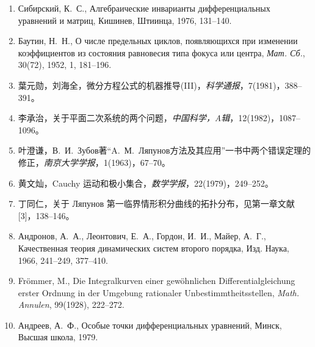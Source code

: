 \begin{enumerate}
\item Сибирский, К.\ С., Алгебраические инварианты дифференциальных уравнений и матриц, Кишинев, Штиинца, 1976, 131--140.
\item Баутин, Н.\ Н., О числе предельных циклов, появляющихся при изменении коэффициентов из состояния равновесия типа фокуса или центра, \textit{Мат. Сб.}, 30(72), 1952, 1, 181--196.
\item 葉元勋，刘海全，微分方程公式的机器推导(III)，\textit{科学通报}，7(1981)，388--391。
\item 李承治，关于平面二次系统的两个问题，\textit{中国科学，A辑}，12(1982)，1087--1096。
\item 叶澄谦，В.\ И.\ Зубов著“A.\ М.\ Ляпунов方法及其应用”一书中两个错误定理的修正，\textit{南京大学学报}，1(1963)，67--70。
\item 黄文灿，Cauchy 运动和极小集合，\textit{数学学报}，22(1979)，249--252。
\item 丁同仁，关于 Ляпунов 第一临界情形积分曲线的拓扑分布，见第一章文献[3]，138--146。
\item Андронов, А.\ А., Леонтович, Е.\ А., Гордон, И.\ И., Майер, А.\ Г., Качественная теория динамических систем второго порядка, Изд. Наука, 1966, 241--249, 377--410.
\item Frömmer, M., Die Integralkurven einer gewöhnlichen Differentialgleichung erster Ordnung in der Umgebung rationaler Unbestimmtheitsstellen, \textit{Math. Annulen}, 99(1928), 222--272.
\item Андреев, А.\ Ф., Особые точки дифференциальных уравнений, Минск, Высшая школа, 1979.
\end{enumerate}

\endinput
